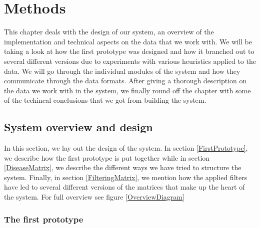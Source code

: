 \chapter{Methods\label{Methods}}

This chapter deals with the design of our system, an overview of the
implementation and technical aspects on the data that we work with. We
will be taking a look at how the first prototype was designed and how
it branched out to several different versions due to experiments with
various heuristics applied to the data. We will go through the
individual modules of the system and how they communicate through the
data formats. After giving a thorough description on the data we work
with in the system, we finally round off the chapter with some of the
techincal conclusions that we got from building the system.

\section{System overview and design\label{SystemOverviewAndDesign}}

In this section, we lay out the design of the system. In section
\ref{FirstPrototype}, we describe how the first prototype is put
together while in section \ref{DiseaseMatrix}, we describe the
different ways we have tried to structure the system. Finally, in section
\ref{FilteringMatrix}, we mention how the applied filters have led to
several different versions of the matrices that make up the heart of
the system. For full overview see figure \ref{OverviewDiagram}

\subsection{The first prototype\label{FirstPrototype}}


